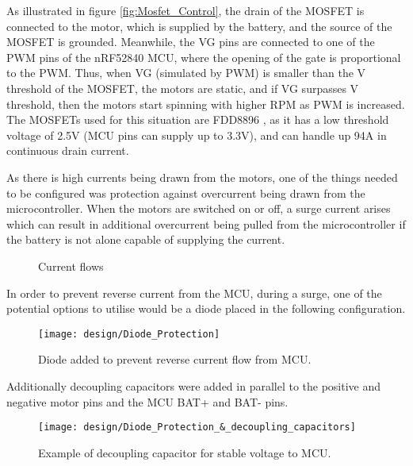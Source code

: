 As illustrated in figure \ref{fig:Mosfet_Control}, the drain of the MOSFET is connected to the motor, which is supplied by 
the battery, and the source of the MOSFET is grounded. Meanwhile, the VG pins are connected to one of the PWM pins 
of the nRF52840 MCU, where the opening of the gate is proportional to the PWM. Thus, when VG (simulated by PWM) is 
smaller than the V threshold of the MOSFET, the motors are static, and if VG surpasses V threshold, then the motors 
start spinning with higher RPM as PWM is increased. 
The MOSFETs used for this situation are FDD8896 \cite{FDD8896}, as it has 
a low threshold voltage of 2.5V (MCU pins can supply 
up to 3.3V), and can handle up 94A in continuous drain 
current.

As there is high currents being drawn from the motors, one of the things needed to be configured was protection 
against overcurrent being drawn from the microcontroller. When the motors are switched on or off, 
a surge current arises which can result in additional overcurrent being pulled from the microcontroller if 
the battery is not alone capable of supplying the current. 


\begin{figure}[H]%
    \centering
    \qquad
    \caption{Current flows}%
    \label{fig:example}%
\end{figure}


In order to prevent reverse current from the MCU, 
during a surge, one of the potential options to utilise would be a diode placed in the following 
configuration. 

\begin{figure}[H]
    \begin{center}
    \texttt{[image: design/Diode\_Protection]}
    \end{center}
    \caption{Diode added to prevent reverse current flow from MCU.}
    \label{fig:Diode_Protection}
\end{figure}

Additionally decoupling capacitors were added in 
parallel to the positive and negative motor pins 
and the MCU BAT+ and BAT- pins.

\begin{figure}[H]
    \begin{center}
    \texttt{[image: design/Diode\_Protection\_\&\_decoupling\_capacitors]}
    \end{center}
    \caption{Example of decoupling capacitor for stable voltage to MCU.}
    \label{fig:Diode_Protection_&_decoupling_capacitors}
\end{figure}


